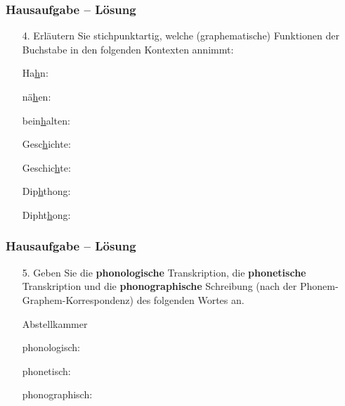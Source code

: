 \begin{frame}
	\frametitle{Hausaufgabe -- Lösung}

\begin{itemize}
\item[4.] Erläutern Sie stichpunktartig, welche (graphematische) Funktionen der Buchstabe  in den folgenden Kontexten annimmt:

\begin{exe}
\settowidth{}
\begin{xlist}
	\ex Ha\underline{h}n: 
	
	\ex nä\underline{h}en: 
	
	\ex bein\underline{h}alten: 
	
	\ex Gesc\underline{h}ichte:  
	
	\ex Geschic\underline{h}te:  
	
	\ex Dip\underline{h}thong: 
	
	\ex Dipht\underline{h}ong: 
\end{xlist}
\end{exe}

\end{itemize}

\end{frame}


\begin{frame}
	\frametitle{Hausaufgabe -- Lösung}

\begin{itemize}
\item[5.] Geben Sie die \textbf{phonologische} Transkription, die \textbf{phonetische} Transkription und die \textbf{phonographische} Schreibung (nach der Phonem-Graphem-Korrespondenz) des folgenden Wortes an.

\begin{exe}
	 Abstellkammer
\end{exe}

\settowidth{}
\item[] phonologisch: 

\item[] phonetisch: 

\item[] phonographisch: 

\item[] 

\end{itemize}
\end{frame}